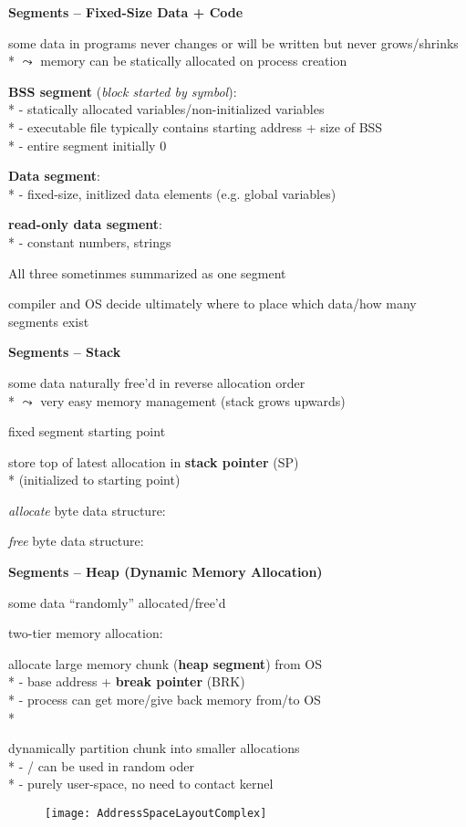 \textbf{Segments -- Fixed-Size Data + Code}
\begin{items}
	\item some data in programs never changes or will be written but never grows/shrinks \\*
		\( \leadsto \) memory can be statically allocated on process creation
	\item \textbf{BSS segment} (\emph{block started by symbol}): \\*
		- statically allocated variables/non-initialized variables \\*
		- executable file typically contains starting address + size of BSS \\*
		- entire segment initially 0
	\item \textbf{Data segment}: \\*
		- fixed-size, initlized data elements (e.g. global variables)
	\item \textbf{read-only data segment}: \\*
		- constant numbers, strings
	\item All three sometinmes summarized as one segment
	\item compiler and OS decide ultimately where to place which data/how many segments exist
\end{items}

\textbf{Segments -- Stack}
\begin{items}
	\item some data naturally free'd in reverse allocation order \\*
		\( \leadsto \) very easy memory management (stack grows upwards)
	\item fixed segment starting point
	\item store top of latest allocation in \textbf{stack pointer} (SP) \\*
		(initialized to starting point)
	\item \emph{allocate}  byte data structure: 
	\item \emph{free}  byte data structure: 
\end{items}

\textbf{Segments -- Heap (Dynamic Memory Allocation)}
\begin{items}
	\item some data "`randomly"' allocated/free'd
	\item two-tier memory allocation:
	\begin{enumeration}
		\item allocate large memory chunk (\textbf{heap segment}) from OS \\*
			- base address + \textbf{break pointer} (BRK) \\*
			- process can get more/give back memory from/to OS \\*
		\item dynamically partition chunk into smaller allocations \\*
			- / can be used in random oder \\*
			- purely user-space, no need to contact kernel
	\end{enumeration}
\end{items}

\begin{figure}[H]\centering\label{AddressSpaceLayoutComplex}\texttt{[image: AddressSpaceLayoutComplex]}\end{figure}